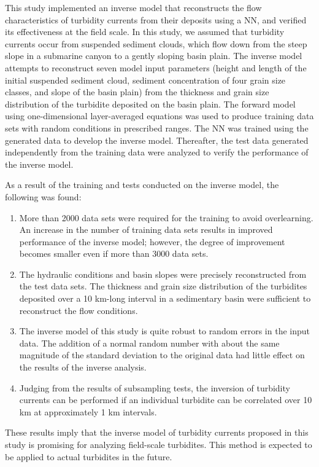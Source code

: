 
This study implemented an inverse model that reconstructs the flow characteristics of turbidity currents from their deposits using a NN, and verified its effectiveness at the field scale. In this study, we assumed that turbidity currents occur from suspended sediment clouds, which flow down from the steep slope in a submarine canyon to a gently sloping basin plain. The inverse model attempts to reconstruct seven model input parameters (height and length of the initial suspended sediment cloud, sediment concentration of four grain size classes, and slope of the basin plain) from the thickness and grain size distribution of the turbidite deposited on the basin plain. The forward model using one-dimensional layer-averaged equations was used to produce training data sets with random conditions in prescribed ranges. The NN was trained using the generated data to develop the inverse model. Thereafter, the test data generated independently from the training data were analyzed to verify the performance of the inverse model.

As a result of the training and tests conducted on the inverse model, the following was found:

\begin{enumerate}

\item More than 2000 data sets were required for the training to avoid overlearning. An increase in the number of training data sets results in improved performance of the inverse model; however, the degree of improvement becomes smaller even if more than 3000 data sets.

\item The hydraulic conditions and basin slopes were precisely reconstructed from the test data sets. The thickness and grain size distribution of the turbidites deposited over a 10 km-long interval in a sedimentary basin were sufficient to reconstruct the flow conditions.

\item The inverse model of this study is quite robust to random errors in the input data. The addition of a normal random number with about the same magnitude of the standard deviation to the original data had little effect on the results of the inverse analysis.

\item Judging from the results of subsampling tests, the inversion of turbidity currents can be performed if an individual turbidite can be correlated over 10 km at approximately 1 km intervals. 

\end{enumerate}

These results imply that the inverse model of turbidity currents proposed in this study is promising for analyzing field-scale turbidites. This method is expected to be applied to actual turbidites in the future.